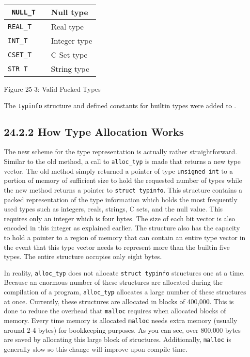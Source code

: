 \begin{center}
\tabletail{}
\tablelasttail{}
\begin{xtabular}{|m{0.6629598in}|m{0.42545983in}|m{0.8122598in}|}
\hline
\texttt{ NULL\_T} &
 &
 Null type\\\hline
 \texttt{REAL\_T} &
 &
 Real type\\\hline
 \texttt{INT\_T} &
 &
 Integer type\\\hline
 \texttt{CSET\_T} &
 &
 C Set type\\\hline
 \texttt{STR\_T} &
 &
 String type\\\hline
\end{xtabular}
\end{center}
{\centering{}
Figure 25-3: Valid Packed Types
\par}

The \texttt{typinfo} structure and defined constants for builtin types
were added to .

\subsection[24.2.2 How Type Allocation Works]{24.2.2 How Type Allocation Works}

The new scheme for the type representation is actually rather
straightforward. Similar to the old method, a call to
\texttt{alloc\_typ} is made that returns a new type vector. The old
method simply returned a pointer of type \texttt{unsigned int} to a
portion of memory of sufficient size to hold the requested number of
types while the new method returns a pointer to \texttt{struct
typinfo}. This structure contains a packed representation of the type
information which holds the most frequently used types such as
integers, reals, strings, C sets, and the null value. This requires
only an integer which is four bytes. The size of each bit vector is
also encoded in this integer as explained earlier. The structure also
has the capacity to hold a pointer to a region of memory that can
contain an entire type vector in the event that this type vector needs
to represent more than the builtin five types. The entire structure
occupies only eight bytes.

In reality, \texttt{alloc\_typ} does not allocate \texttt{struct
typinfo} structures one at a time. Because an enormous number of these
structures are allocated during the compilation of a program,
\texttt{alloc\_typ} allocates a large number of these structures at
once. Currently, these structures are allocated in blocks of
400,000. This is done to reduce the overhead that \texttt{malloc}
requires when allocated blocks of memory. Every time memory is
allocated \texttt{malloc} needs extra memory (usually around 2-4
bytes) for bookkeeping purposes. As you can see, over 800,000 bytes
are saved by allocating this large block of structures. Additionally,
\texttt{malloc} is generally slow so this change will improve upon
compile time.


